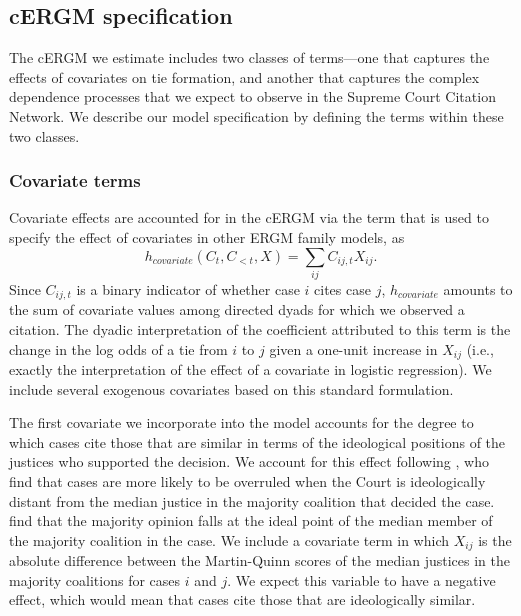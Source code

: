 \documentclass{cup-pan}
\begin{document}
\subsection{cERGM specification}

The cERGM we estimate includes two classes of terms---one that captures the effects of covariates on tie formation, and another that captures the complex dependence processes that we expect to observe in the Supreme Court Citation Network. We describe our model specification by defining the terms within these two classes.


\subsubsection{Covariate terms}\label{covariate_terms}

Covariate effects are accounted for in the cERGM via the term that is used to specify the effect of covariates in other ERGM family models, as
$$h_{covariate}(C_t,C_{<t},X) =  \sum_{ij} C_{ij,t}X_{ij}.$$ Since $C_{ij,t}$ is a binary indicator of whether case $i$ cites case $j$, $h_{covariate}$ amounts to the sum of covariate values among directed dyads for which we observed a citation. The dyadic interpretation of the coefficient attributed to this term is the change in the log odds of a tie from $i$ to $j$ given a one-unit increase in $X_{ij}$ (i.e., exactly the interpretation of the effect of a covariate in logistic regression). We include several exogenous covariates based on this standard formulation. 

The first covariate we incorporate into the model accounts for the degree to which cases cite those that are similar in terms of the ideological positions of the justices who supported the decision. We account for this effect following \citet{spriggs2001explaining}, who find that cases are more likely to be overruled when the Court is ideologically distant from the median justice in the majority coalition that decided the case. \citet{clark2010locating} find that the majority opinion falls at the ideal point of the median member of the majority coalition in the case. We include a covariate term in which $X_{ij}$ is the absolute difference between the Martin-Quinn scores \citep{martin2002dynamic} of the median justices in the majority coalitions for cases $i$ and $j$. We expect this variable to have a negative effect, which would mean that cases cite those that are ideologically similar. %
\end{document}

